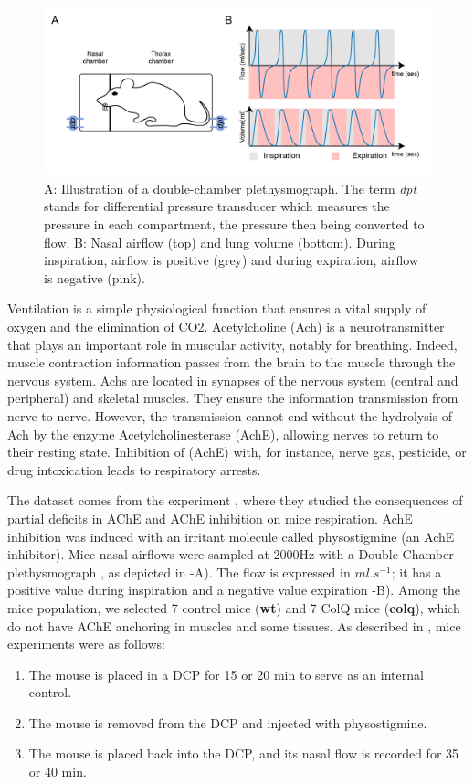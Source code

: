 \begin{figure}
  \centering
  \includegraphics[width = \linewidth]{pictures/mice_exp.png}
  \caption{A: Illustration of a double-chamber plethysmograph. The term \textit{dpt} stands for differential 
  pressure transducer which measures the pressure in each compartment, the pressure then being converted to flow. 
  B: Nasal airflow (top) and lung volume (bottom). During inspiration, airflow is positive (grey) and during
  expiration, airflow is negative (pink).}
  \label{fig:mice_exp}
\end{figure}

\label{appendix:mouse_dataset}
Ventilation is a simple physiological function that ensures a vital supply of oxygen and the elimination of CO2. 
Acetylcholine (Ach) is a neurotransmitter that plays an important role in muscular activity, notably for breathing. 
Indeed, muscle contraction information passes from the brain to the muscle through the nervous system. Achs are located 
in synapses of the nervous system (central and peripheral) and skeletal muscles. They ensure the information transmission 
from nerve to nerve. However, the transmission cannot end without the hydrolysis of Ach by the enzyme Acetylcholinesterase 
(AchE), allowing nerves to return to their resting state. Inhibition of (AchE) with, for instance, nerve gas, pesticide, 
or drug intoxication leads to respiratory arrests. 

The dataset comes from the experiment \cite{nervo2019respiratory}, where they studied the consequences of partial 
deficits in AChE and AChE inhibition on mice respiration. AchE inhibition was induced with an 
irritant molecule called physostigmine (an AchE inhibitor). Mice nasal airflows were sampled at 
2000Hz with a Double Chamber plethysmograph \cite{hoymann2012lung}, as depicted in -A). The flow is expressed in 
$ml.s^{-1}$; it has a positive value during inspiration and a negative value expiration -B). 
Among the mice population, we selected 7 control mice (\textbf{wt}) and 7 ColQ mice (\textbf{colq}), which do not have 
AChE anchoring in muscles and some tissues. 
As described in \cite{nervo2019respiratory}, mice experiments were as follows:
\begin{enumerate}
  \item The mouse is placed in a DCP for 15 or 20 min to serve as an internal control.
  \item The mouse is removed from the DCP and injected with physostigmine.
  \item The mouse is placed back into the DCP, and its nasal flow is recorded for 35 or 40 min.
\end{enumerate}

